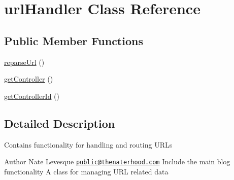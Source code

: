 \hypertarget{classurlHandler}{\section{url\-Handler Class Reference}
\label{classurlHandler}
}
\subsection*{Public Member Functions}
\begin{DoxyCompactItemize}
\item 
\hyperlink{classurlHandler_ae4fbc10799a30bfed0adfb7e1bc4d065}{reparse\-Url} ()
\item 
\hyperlink{classurlHandler_ac15274538beabbd91be8806e34a8d0a5}{get\-Controller} ()
\item 
\hyperlink{classurlHandler_a7791427f40a3a6bd741d03eb0273ebf0}{get\-Controller\-Id} ()
\end{DoxyCompactItemize}


\subsection{Detailed Description}
Contains functionality for handling and routing U\-R\-Ls

\begin{DoxyAuthor}{Author}
Nate Levesque \href{mailto:public@thenaterhood.com}{\tt public@thenaterhood.\-com} Include the main blog functionality A class for managing U\-R\-L related data 
\end{DoxyAuthor}


